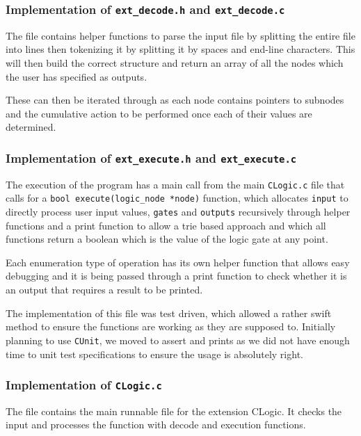 \documentclass[11pt]{article}
\begin{document}
\subsubsection{Implementation of \texttt{ext\_decode.h} and \texttt{ext\_decode.c}}

The file contains helper functions to parse the input file by splitting the entire file into lines then tokenizing it by splitting it by spaces and end-line characters. This will then build the correct structure and return an array of all the nodes which the user has specified as outputs.

These can then be iterated through as each node contains pointers to subnodes and the cumulative action to be performed once each of their values are determined.

\subsubsection{Implementation of \texttt{ext\_execute.h} and \texttt{ext\_execute.c}}
\begin{sloppypar}
The execution of the program has a main call from the main \texttt{CLogic.c} file that calls for a \texttt{bool execute(logic\_node *node)} function, which allocates \texttt{input} to directly process user input values, \texttt{gates} and \texttt{outputs} recursively through helper functions and a print function to allow a trie based approach and which all functions return a boolean which is the value of the logic gate at any point.
\end{sloppypar}
Each enumeration type of operation has its own helper function that allows easy debugging and it is being passed through a print function to check whether it is an output that requires a result to be printed.

The implementation of this file was test driven, which allowed a rather swift method to ensure the functions are working as they are supposed to. Initially planning to use \texttt{CUnit}, we moved to assert and prints as we did not have enough time to unit test specifications to ensure the usage is absolutely right.

\subsubsection{Implementation of \texttt{CLogic.c}}

The file contains the main runnable file for the extension CLogic.  It checks the input and processes the function with decode and execution functions.
\end{document}
